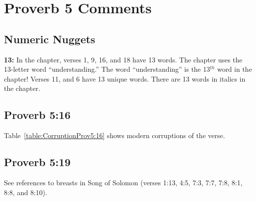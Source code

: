 \section{Proverb 5 Comments}

\subsection{Numeric Nuggets}
\textbf{13:} In the chapter, verses 1, 9, 16, and 18 have 13 words. The chapter uses the 13-letter word ``understanding.'' The word ``understanding'' is the 13$^{th}$ word in the chapter! Verses 11, and 6  have 13 unique words. There are 13 words in italics in the chapter.


\subsection{Proverb 5:16}
Table~\ref{table:CorruptionProv5:16} shows modern corruptions of the verse. 

\subsection{Proverb 5:19}
See references to breasts in Song of Solomon (verses 1:13, 4:5, 7:3, 7:7, 7:8, 8:1, 8:8, and 8:10). 

